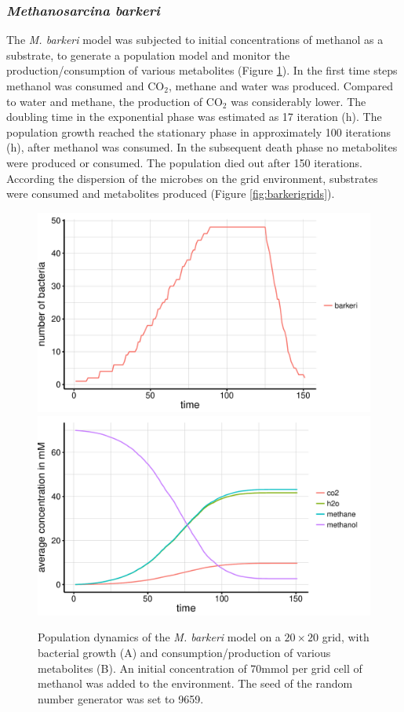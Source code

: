 \subsubsection{\textit{Methanosarcina barkeri}}
The \textit{M. barkeri} model was subjected to initial concentrations of methanol as a substrate, to generate a population model and monitor the production/consumption of various metabolites (Figure \hyperref[fig:barkerisg]{\ref{fig:barkerisg}}). In the first time steps methanol was consumed and CO$_2$, methane and water was produced. Compared to water and methane, the production of CO$_2$ was considerably lower.
The doubling time in the exponential phase was estimated as 17 iteration (h).
The population growth reached the stationary phase in approximately 100 iterations (h), after methanol was consumed. In the subsequent death phase no metabolites were produced or consumed. The population died out after 150 iterations.
According the dispersion of the microbes on the grid environment, substrates were consumed and metabolites produced (Figure \hyperref[fig:barkerigrids]{\ref{fig:barkerigrids}}).
\begin{figure}[h!]
  \centering
    \includegraphics[scale=0.45]{../results/img/barkeri_20x20_seed9659_growth.pdf}
    \includegraphics[scale=0.45]{../results/img/barkeri_20x20_seed9659_subs.pdf}
  \caption{Population dynamics of the \emph{M. barkeri} model on a $20\times20$ grid, with bacterial growth (A) and consumption/production of various metabolites (B). An initial concentration of 70\;mmol per grid cell of methanol was added to the environment. The seed of the random number generator was set to 9659.}
  \label{fig:barkerisg}
\end{figure}
